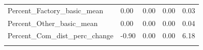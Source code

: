 \documentclass[]{article}
\begin{document}
\begin{longtable}[]{@{}lllll@{}}
\begin{minipage}[t]{0.49\columnwidth}\raggedright\strut
Percent\_Factory\_basic\_mean\strut
\end{minipage} & \begin{minipage}[t]{0.08\columnwidth}\raggedright\strut
0.00\strut
\end{minipage} & \begin{minipage}[t]{0.09\columnwidth}\raggedright\strut
0.00\strut
\end{minipage} & \begin{minipage}[t]{0.09\columnwidth}\raggedright\strut
0.00\strut
\end{minipage} & \begin{minipage}[t]{0.11\columnwidth}\raggedright\strut
0.03\strut
\end{minipage}\tabularnewline
\begin{minipage}[t]{0.49\columnwidth}\raggedright\strut
Percent\_Other\_basic\_mean\strut
\end{minipage} & \begin{minipage}[t]{0.08\columnwidth}\raggedright\strut
0.00\strut
\end{minipage} & \begin{minipage}[t]{0.09\columnwidth}\raggedright\strut
0.00\strut
\end{minipage} & \begin{minipage}[t]{0.09\columnwidth}\raggedright\strut
0.00\strut
\end{minipage} & \begin{minipage}[t]{0.11\columnwidth}\raggedright\strut
0.04\strut
\end{minipage}\tabularnewline
\begin{minipage}[t]{0.49\columnwidth}\raggedright\strut
Percent\_Com\_dist\_perc\_change\strut
\end{minipage} & \begin{minipage}[t]{0.08\columnwidth}\raggedright\strut
-0.90\strut
\end{minipage} & \begin{minipage}[t]{0.09\columnwidth}\raggedright\strut
0.00\strut
\end{minipage} & \begin{minipage}[t]{0.09\columnwidth}\raggedright\strut
0.00\strut
\end{minipage} & \begin{minipage}[t]{0.11\columnwidth}\raggedright\strut
6.18\strut
\end{minipage}\tabularnewline
\begin{minipage}[t]{0.49\columnwidth}\raggedright\strut

\end{minipage}
\end{longtable}
\end{document}
